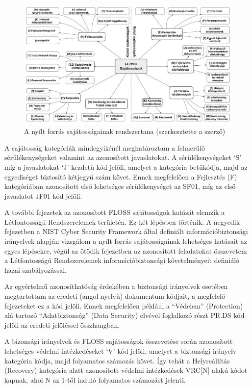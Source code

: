 \documentclass[12pt,magyar,a4paper,oneside]{scrreprt}
\begin{document}
\begin{figure}
\hypertarget{fig:FLOSSSaj}{%
\centering
\includegraphics{ábrák/FLOSS-jellegzetességek.pdf}
\caption{A nyílt forrás sajátosságainak rendszertana (szerkesztette a
szerző)}\label{fig:FLOSSSaj}
}
\end{figure}

A sajátosság kategóriák mindegyikénél meghatároztam a felmerülő
sérülékenységeket valamint az azonosított javaslatokat. A
sérülékenységeket `S' míg a javaslatokat `J' kezdetű kód jelöli, amelyet
a kategória betűkódja, majd az egyediséget biztosító kétjegyű szám
követ. Ennek megfelelően a Fejlesztés (F) kategóriában azonosított első
lehetséges sérülékenységet az SF01, míg az első javaslatot JF01 kód
jelöli.

A további fejezetek az azonosított FLOSS sajátosságok hatását elemzik a
Létfontosságú Rendszerelemek területén. Ez két lépésben történik. A
negyedik fejezetben a NIST Cyber Security Framework által definiált
információbiztonsági irányelvek alapján vizsgálom a nyílt forrás
sajátosságainak lehetséges hatásait az egyes lépésekre, végül az ötödik
fejezetben az azonosított feladatokat összevetem a Létfontosságú
Rendszerelemek információbiztonsági követelményeit definiáló hazai
szabályozással.

Az egyértelmű azonosíthatóság érdekében a biztonsági irányelvek esetében
megtartottam az eredeti (angol nyelvű) dokumentum kódjait, a megfelelő
fejezeteket ez a kód jelöli. Ennek megfelelően például a ``Védelem''
(Protection) alá tartozó ``Adatbiztonság'' (Data Security) elvével
foglalkozó részt PR.DS kód jelöli az eredeti jelöléssel összhangban.

A bizonsági irányelvek és FLOSS sajátosságok összevetése során
azonosított lehetséges védelmi intézkedéseket `V' kód jelöli, amelyet a
biztonsági irányelv kategória kódja, majd folyamatos számozás követ. Így
tehát a Helyreállítás (Recovery) kategória alatt azonosított védelmi
intézkedések VRC{[}N{]} alakú kódot kapnak, ahol N az 1-től induló
folyamatos számozást jelenti.
\end{document}
